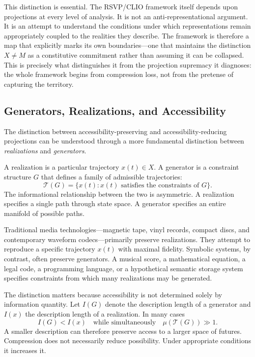 \documentclass[12pt, a4paper]{article}
\theoremstyle{plain}
\theoremstyle{definition}
\theoremstyle{remark}
\begin{document}
This distinction is essential.
The RSVP/CLIO framework itself depends upon projections at every level of analysis.
It is not an anti-representational argument.
It is an attempt to understand the conditions under which representations remain
appropriately coupled to the realities they describe.
The framework is therefore a map that explicitly marks its own boundaries---one
that maintains the distinction $X \neq M$ as a constitutive commitment rather than
assuming it can be collapsed.
This is precisely what distinguishes it from the projection supremacy it diagnoses:
the whole framework begins from compression loss, not from the pretense of capturing
the territory.

\subsection{Generators, Realizations, and Accessibility}

The distinction between accessibility-preserving and accessibility-reducing projections
can be understood through a more fundamental distinction between \emph{realizations}
and \emph{generators}.

A realization is a particular trajectory $x(t) \in X$.
A generator is a constraint structure $G$ that defines a family of admissible trajectories:
\[
\mathcal{T}(G) = \{x(t) : x(t) \text{ satisfies the constraints of } G\}.
\]
The informational relationship between the two is asymmetric.
A realization specifies a single path through state space.
A generator specifies an entire manifold of possible paths.

Traditional media technologies---magnetic tape, vinyl records, compact discs,
and contemporary waveform codecs---primarily preserve realizations.
They attempt to reproduce a specific trajectory $x(t)$ with maximal fidelity.
Symbolic systems, by contrast, often preserve generators.
A musical score, a mathematical equation, a legal code, a programming language,
or a hypothetical semantic storage system specifies constraints from which many
realizations may be generated.

The distinction matters because accessibility is not determined solely by information
quantity.
Let $I(G)$ denote the description length of a generator and $I(x)$ the description
length of a realization.
In many cases
\[
I(G) < I(x) \quad \text{while simultaneously} \quad \mu(\mathcal{T}(G)) \gg 1.
\]
A smaller description can therefore preserve access to a larger space of futures.
Compression does not necessarily reduce possibility.
Under appropriate conditions it increases it.
\end{document}
